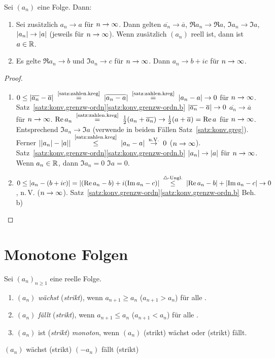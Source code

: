 \documentclass[12pt]{scrreprt}
\begin{document}
\begin{satz}
  \label{satz:konv.grenzw-komplex}
  Sei $(a_n)$ eine Folge. Dann:
  \begin{enumerate}
  \item Sei zusätzlich $a_n\to a$ für $n\rightarrow\infty$. Dann gelten
    $\overline{a_n}\to\overline{a}$, $\Re{a_n}\to\Re{a}$,
    $\Im{a_n}\to\Im{a}$, $\left\lvert a_n\right\lvert\to\left\lvert a\right\lvert$ (jeweils für
    $n\rightarrow\infty$). Wenn zusätzlich $(a_n)$ reell ist, dann ist $a\in\mathbb{R}$.
  \item Es gelte $\Re{a_n}\to b$ und $\Im{a_n}\to c$ für $n\rightarrow\infty$. Dann
    $a_n\to b+ic$ für $n\rightarrow\infty$.
  \end{enumerate}
\end{satz}
\begin{proof}
  \begin{enumerate}
  \item $0\le\abs{\overline{a_n}-\overline{a}}
    \nach{=}{\ref{satz:zahlen.kreg}} \abs{\overline{a_n-a}}
    \nach{=}{\ref{satz:zahlen.kreg}} \abs{a_n-a}\to0$ für
    $n\rightarrow\infty$. Satz~\ref{satz:konv.grenzw-ordn}\ref{satz:konv.grenzw-ordn.b}
    \folgt $\left\lvert\overline{a_n}-\overline{a}\right\lvert\to0$ \folgt
    $\overline{a_n}\to\overline{a}$ für $n\rightarrow\infty$. \folgt $\Re{a_n}
    \nach{=}{\ref{satz:zahlen.kreg}}
    \frac12(a_n+\overline{a_n})\to\frac12(a+\overline{a})=\Re{a}$ für
    $n\rightarrow\infty$. Entsprechend $\Im{a_n}\to\Im{a}$ (verwende in beiden
    Fällen Satz~\ref{satz:konv.greg}). Ferner $\abs{\abs{a_n}-\abs{a}}
    \nach{\le}{\ref{satz:zahlen.kreg}} |a_n-a| \nach{\ra}{n.V.} 0$
    ($n\rightarrow\infty$). Satz~\ref{satz:konv.grenzw-ordn}\ref{satz:konv.grenzw-ordn.b}
    \folgt $\left\lvert a_n\right\lvert\to\left\lvert a\right\lvert$ für $n\rightarrow\infty$. Wenn $a_n\in\mathbb{R}$, dann
    $\Im{a_n}=0$ \folgt $\Im{a}=0$.
  \item $0\le\abs{a_n-(b+ic)}=\abs{(\Re{a_n}-b)+i(\Im{a_n}-c)}
    \nach{\le}{$\triangle$-Ungl.}
    \abs{\Re{a_n}-b}+\abs{\Im{a_n}-c}\to0$,
    n.\,V. ($n\rightarrow\infty$). Satz~\ref{satz:konv.grenzw-ordn}\ref{satz:konv.grenzw-ordn.b}
    \folgt Beh. b)
  \end{enumerate}
\end{proof}

\section{Monotone Folgen}
\label{sec:konv.folge-monoton}

\begin{dfn}
  \label{dfn:konv.monotonie}
  Sei $(a_n)_{n\ge1}$ eine reelle Folge.
  \begin{enumerate}
  \item $(a_n)$ \emph{wächst} (\emph{strikt}), wenn $a_{n+1}\ge a_n$
    ($a_{n+1}>a_n$) für alle .
  \item $(a_n)$ \emph{fällt} (\emph{strikt}), wenn $a_{n+1}\le a_n$
    ($a_{n+1}<a_n$) für alle .
  \item $(a_n)$ ist (\emph{strikt}) \emph{monoton}, wenn $(a_n)$
    (strikt) wächst oder (strikt) fällt.
  \end{enumerate}
  \begin{bem*}
    $(a_n)$ wächst (strikt) \gdw $\left(-a_n\right)$ fällt (strikt)
  \end{bem*}
\end{dfn}
\end{document}
